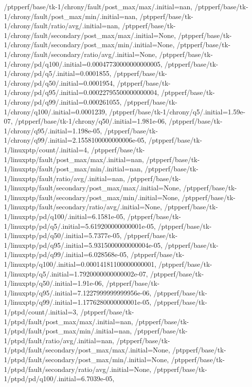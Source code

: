 {    /ptpperf/base/tk-1/chrony/fault/post_max/max/.initial=nan,
    /ptpperf/base/tk-1/chrony/fault/post_max/min/.initial=nan,
    /ptpperf/base/tk-1/chrony/fault/ratio/avg/.initial=nan,
    /ptpperf/base/tk-1/chrony/fault/secondary/post_max/max/.initial=None,
    /ptpperf/base/tk-1/chrony/fault/secondary/post_max/min/.initial=None,
    /ptpperf/base/tk-1/chrony/fault/secondary/ratio/avg/.initial=None,
    /ptpperf/base/tk-1/chrony/pd/q100/.initial=0.00047730000000000005,
    /ptpperf/base/tk-1/chrony/pd/q5/.initial=0.0001855,
    /ptpperf/base/tk-1/chrony/pd/q50/.initial=0.0001954,
    /ptpperf/base/tk-1/chrony/pd/q95/.initial=0.00022795500000000004,
    /ptpperf/base/tk-1/chrony/pd/q99/.initial=0.000261055,
    /ptpperf/base/tk-1/chrony/q100/.initial=0.0001239,
    /ptpperf/base/tk-1/chrony/q5/.initial=1.59e-07,
    /ptpperf/base/tk-1/chrony/q50/.initial=1.981e-06,
    /ptpperf/base/tk-1/chrony/q95/.initial=1.198e-05,
    /ptpperf/base/tk-1/chrony/q99/.initial=2.1558100000000006e-05,
    /ptpperf/base/tk-1/linuxptp/count/.initial=4,
    /ptpperf/base/tk-1/linuxptp/fault/post_max/max/.initial=nan,
    /ptpperf/base/tk-1/linuxptp/fault/post_max/min/.initial=nan,
    /ptpperf/base/tk-1/linuxptp/fault/ratio/avg/.initial=nan,
    /ptpperf/base/tk-1/linuxptp/fault/secondary/post_max/max/.initial=None,
    /ptpperf/base/tk-1/linuxptp/fault/secondary/post_max/min/.initial=None,
    /ptpperf/base/tk-1/linuxptp/fault/secondary/ratio/avg/.initial=None,
    /ptpperf/base/tk-1/linuxptp/pd/q100/.initial=6.1581e-05,
    /ptpperf/base/tk-1/linuxptp/pd/q5/.initial=5.619200000000001e-05,
    /ptpperf/base/tk-1/linuxptp/pd/q50/.initial=5.7377e-05,
    /ptpperf/base/tk-1/linuxptp/pd/q95/.initial=5.9315000000000004e-05,
    /ptpperf/base/tk-1/linuxptp/pd/q99/.initial=6.028568e-05,
    /ptpperf/base/tk-1/linuxptp/q100/.initial=0.00014181100000000001,
    /ptpperf/base/tk-1/linuxptp/q5/.initial=1.7920000000000002e-07,
    /ptpperf/base/tk-1/linuxptp/q50/.initial=1.91e-06,
    /ptpperf/base/tk-1/linuxptp/q95/.initial=7.1227999999999956e-06,
    /ptpperf/base/tk-1/linuxptp/q99/.initial=1.1776280000000001e-05,
    /ptpperf/base/tk-1/ptpd/count/.initial=3,
    /ptpperf/base/tk-1/ptpd/fault/post_max/max/.initial=nan,
    /ptpperf/base/tk-1/ptpd/fault/post_max/min/.initial=nan,
    /ptpperf/base/tk-1/ptpd/fault/ratio/avg/.initial=nan,
    /ptpperf/base/tk-1/ptpd/fault/secondary/post_max/max/.initial=None,
    /ptpperf/base/tk-1/ptpd/fault/secondary/post_max/min/.initial=None,
    /ptpperf/base/tk-1/ptpd/fault/secondary/ratio/avg/.initial=None,
    /ptpperf/base/tk-1/ptpd/pd/q100/.initial=6.7039e-05,
}
